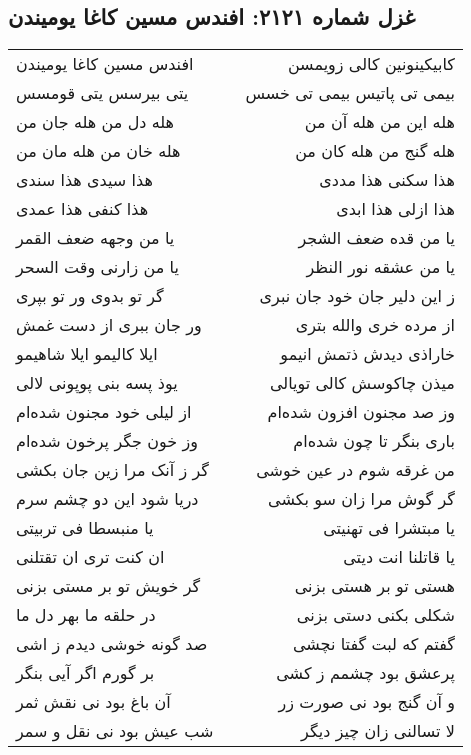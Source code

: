 \begin{center}
\section*{غزل شماره ۲۱۲۱: افندس مسین کاغا یومیندن}
\label{sec:2121}
\begin{longtable}{l p{0.5cm} r}
افندس مسین کاغا یومیندن
&&
کابیکینونین کالی زویمسن
\\
یتی بیرسس یتی قومسس
&&
بیمی تی پاتیس بیمی تی خسس
\\
هله دل من هله جان من
&&
هله این من هله آن من
\\
هله خان من هله مان من
&&
هله گنج من هله کان من
\\
هذا سیدی هذا سندی
&&
هذا سکنی هذا مددی
\\
هذا کنفی هذا عمدی
&&
هذا ازلی هذا ابدی
\\
یا من وجهه ضعف القمر
&&
یا من قده ضعف الشجر
\\
یا من زارنی وقت السحر
&&
یا من عشقه نور النظر
\\
گر تو بدوی ور تو بپری
&&
ز این دلیر جان خود جان نبری
\\
ور جان ببری از دست غمش
&&
از مرده خری والله بتری
\\
ایلا کالیمو ایلا شاهیمو
&&
خاراذی دیدش ذتمش انیمو
\\
یوذ پسه بنی پوپونی لالی
&&
میذن چاکوسش کالی تویالی
\\
از لیلی خود مجنون شده‌ام
&&
وز صد مجنون افزون شده‌ام
\\
وز خون جگر پرخون شده‌ام
&&
باری بنگر تا چون شده‌ام
\\
گر ز آنک مرا زین جان بکشی
&&
من غرقه شوم در عین خوشی
\\
دریا شود این دو چشم سرم
&&
گر گوش مرا زان سو بکشی
\\
یا منبسطا فی تربیتی
&&
یا مبتشرا فی تهنیتی
\\
ان کنت تری ان تقتلنی
&&
یا قاتلنا انت دیتی
\\
گر خویش تو بر مستی بزنی
&&
هستی تو بر هستی بزنی
\\
در حلقه ما بهر دل ما
&&
شکلی بکنی دستی بزنی
\\
صد گونه خوشی دیدم ز اشی
&&
گفتم که لبت گفتا نچشی
\\
بر گورم اگر آیی بنگر
&&
پرعشق بود چشمم ز کشی
\\
آن باغ بود نی نقش ثمر
&&
و آن گنج بود نی صورت زر
\\
شب عیش بود نی نقل و سمر
&&
لا تسالنی زان چیز دیگر
\\
\end{longtable}
\end{center}
